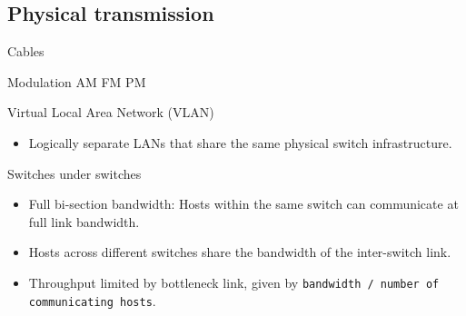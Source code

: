 
\subsection{Physical transmission}

Cables

Modulation
AM FM PM

\begin{definition}
    {Virtual Local Area Network (VLAN)}
    \begin{itemize}
        \item Logically separate LANs that share the same physical switch infrastructure.
    \end{itemize}
\end{definition}

\begin{theorem}
    {Switches under switches}
    \begin{itemize}
        \item Full bi-section bandwidth: Hosts within the same switch can communicate at full link bandwidth.
        \item Hosts across different switches share the bandwidth of the inter-switch link.
        \item Throughput limited by bottleneck link, given by \texttt{bandwidth / number of communicating hosts}.
    \end{itemize}
\end{theorem}

